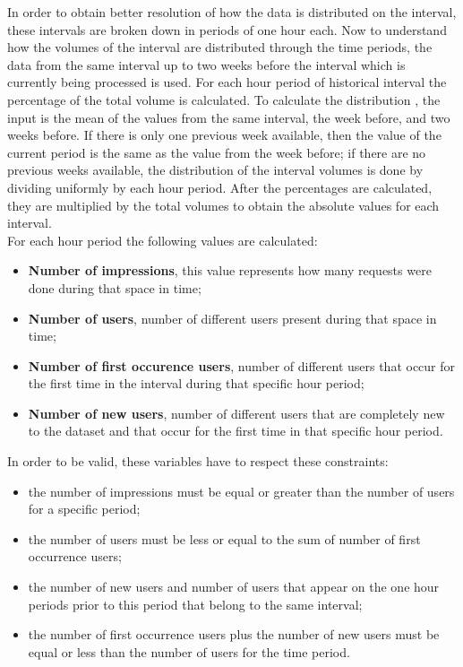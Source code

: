 In order to obtain better resolution of how the data is distributed on the
interval, these intervals are broken down in periods of one hour each. Now to
understand how the volumes of the interval are distributed through the time periods,
the data from the same interval up to two weeks before the interval which is
currently
being processed is used. For each hour period of historical interval the
percentage of the total volume is calculated.
To calculate the distribution , the input is the mean of the values from the
same interval, the week before, and two weeks before. If there is only one
previous week available, then the value of the current period is the same as the
value from the week before; if there are no previous weeks available, the
distribution of the interval volumes is done by dividing uniformly by each hour
period.
After the percentages are
calculated, they are multiplied by the total volumes to obtain the absolute
values for each interval.
\\
For each hour period the following values are calculated:
\begin{itemize}
  \item \textbf{Number of impressions}, this value represents how many requests
    were done during that space in time;
  \item \textbf{Number of users}, number of different users present during that
    space in time;
  \item \textbf{Number of first occurence users}, number of different users that
    occur for the first time in the interval during that specific hour period;
  \item \textbf{Number of new users}, number of different users that are
    completely new to the dataset and that occur for the first time in that specific
    hour period.
\end{itemize}

In order to be valid, these variables have to respect these constraints:
\begin{itemize}
\item the number of impressions must be equal or greater than the number of
  users for a specific period;
\item the number of users must be less or equal to the sum of number of first
  occurrence users;
\item the number of new users and number of users that appear on the one hour
periods prior to this period that belong to the same interval;
\item the number of first occurrence users plus the number of new users must be
  equal or less than the number of users for the time period.
\end{itemize}


